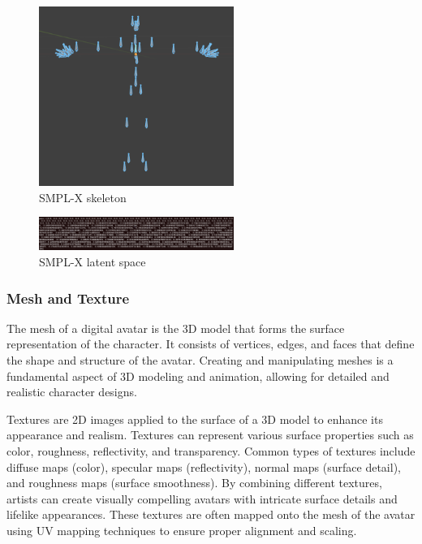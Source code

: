 \documentclass[../../main.tex]{subfiles}
\begin{document}
\begin{figure} 
  \centering \includegraphics[width = 2.5in]{chapters/background_work/images/smpl_x_skeleton.png} 
  \caption{SMPL-X skeleton} 
  \label{fig:smpl_x_skeleton} 
\end{figure}

\begin{figure} 
  \centering \includegraphics[width = 2.5in]{chapters/background_work/images/latent_space_smplx.png} 
  \caption{SMPL-X latent space} 
  \label{fig:latent_space_smplx} 
\end{figure}

\subsubsection{Mesh and Texture}
\label{ch:background_work:sign_language_synthesis:3d_techniques:mesh_and_texture}

The mesh of a digital avatar is the 3D model that forms the surface representation of the character. It consists of vertices, edges, and faces that define the shape and structure of the avatar. Creating and manipulating meshes is a fundamental aspect of 3D modeling and animation, allowing for detailed and realistic character designs.

Textures are 2D images applied to the surface of a 3D model to enhance its appearance and realism. Textures can represent various surface properties such as color, roughness, reflectivity, and transparency. Common types of textures include diffuse maps (color), specular maps (reflectivity), normal maps (surface detail), and roughness maps (surface smoothness). By combining different textures, artists can create visually compelling avatars with intricate surface details and lifelike appearances. These textures are often mapped onto the mesh of the avatar using UV mapping techniques to ensure proper alignment and scaling.
\end{document}
